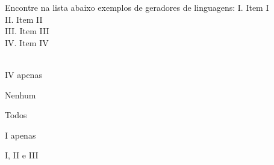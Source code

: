 \question[10]
Encontre na lista abaixo exemplos de geradores de linguagens:
I. Item I\\
II. Item II\\
III. Item III\\
IV. Item IV\\
\\
\begin{choices}
\item IV apenas
\item Nenhum
\item Todos
\item I apenas %
\item I, II e III
\end{choices}
\answerline

